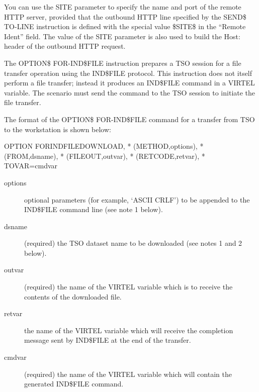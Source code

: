 \documentclass[letterpaper,10pt,english]{sphinxmanual}
\begin{document}
You can use the SITE parameter to specify the name and port of the remote HTTP server, provided that the outbound HTTP line specified by the SEND\$ TO-LINE instruction is defined with the special value \$SITE\$ in the “Remote Ident” field. The value of the SITE parameter is also used to build the Host: header of the outbound HTTP request.


The OPTION\$ FOR-IND\$FILE instruction prepares a TSO session for a file transfer operation using the IND\$FILE
protocol. This instruction does not itself perform a file transfer; instead it produces an IND\$FILE command in a VIRTEL
variable. The scenario must send the command to the TSO session to initiate the file transfer.

The format of the OPTION\$ FOR-IND\$FILE command for a transfer from TSO to the workstation is shown below:

\begin{sphinxVerbatim}[commandchars=\\\{\}]
OPTION\PYGZdl{} FOR\PYGZhy{}IND\PYGZdl{}FILE\PYGZhy{}DOWNLOAD,                     *
    (METHOD,\PYGZsq{}options\PYGZsq{}),                            *
    (FROM,\PYGZsq{}dsname\PYGZsq{}),                               *
    (FILE\PYGZhy{}OUT,\PYGZsq{}outvar\PYGZsq{}),                           *
    (RET\PYGZhy{}CODE,\PYGZsq{}retvar\PYGZsq{}),                           *
    TOVAR=\PYGZsq{}cmdvar\PYGZsq{}
\end{sphinxVerbatim}
\begin{description}
\item[{options}] \leavevmode
optional parameters (for example, ‘ASCII CRLF’) to be appended to the IND\$FILE command line (see note 1 below).

\item[{dsname}] \leavevmode
(required) the TSO dataset name to be downloaded (see notes 1 and 2 below).

\item[{outvar}] \leavevmode
(required) the name of the VIRTEL variable which is to receive the contents of the downloaded file.

\item[{retvar}] \leavevmode
the name of the VIRTEL variable which will receive the completion message sent by IND\$FILE at the end of the transfer.

\item[{cmdvar}] \leavevmode
(required) the name of the VIRTEL variable which will contain the generated IND\$FILE command.

\end{description}
\end{document}

